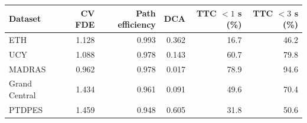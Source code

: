 \begin{tabular}{lrrrrr}
\hline
Dataset & CV FDE & Path efficiency & DCA & TTC $<1$ s (\%) & TTC $<3$ s (\%) \\
\hline
ETH & 1.128 & 0.993 & 0.362 & 16.7 & 46.2 \\
UCY & 1.088 & 0.978 & 0.143 & 60.7 & 79.8 \\
MADRAS & 0.962 & 0.978 & 0.017 & 78.9 & 94.6 \\
Grand Central & 1.434 & 0.961 & 0.091 & 49.6 & 70.4 \\
PTDPES & 1.459 & 0.948 & 0.605 & 31.8 & 50.6 \\
\hline
\end{tabular}
